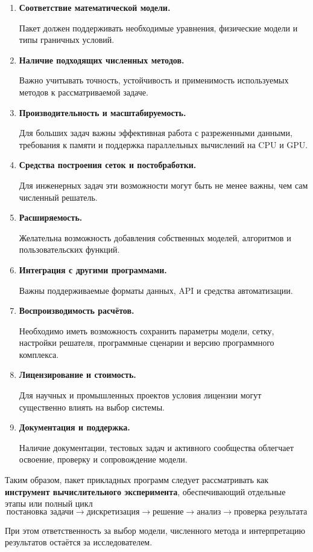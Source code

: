\begin{enumerate}
	\item \textbf{Соответствие математической модели.}
	
	Пакет должен поддерживать необходимые уравнения, физические модели и типы граничных условий.
	
	\item \textbf{Наличие подходящих численных методов.}
	
	Важно учитывать точность, устойчивость и применимость используемых методов к рассматриваемой задаче.
	
	\item \textbf{Производительность и масштабируемость.}
	
	Для больших задач важны эффективная работа с разреженными данными, требования к памяти и поддержка параллельных вычислений на CPU и GPU.
	
	\item \textbf{Средства построения сеток и постобработки.}
	
	Для инженерных задач эти возможности могут быть не менее важны, чем сам численный решатель.
	
	\item \textbf{Расширяемость.}
	
	Желательна возможность добавления собственных моделей, алгоритмов и пользовательских функций.
	
	\item \textbf{Интеграция с другими программами.}
	
	Важны поддерживаемые форматы данных, API и средства автоматизации.
	
	\item \textbf{Воспроизводимость расчётов.}
	
	Необходимо иметь возможность сохранить параметры модели, сетку, настройки решателя, программные сценарии и версию программного комплекса.
	
	\item \textbf{Лицензирование и стоимость.}
	
	Для научных и промышленных проектов условия лицензии могут существенно влиять на выбор системы.
	
	\item \textbf{Документация и поддержка.}
	
	Наличие документации, тестовых задач и активного сообщества облегчает освоение, проверку и сопровождение модели.
\end{enumerate}

Таким образом, пакет прикладных программ следует рассматривать как \textbf{инструмент вычислительного эксперимента}, обеспечивающий отдельные этапы или полный цикл
\[
\boxed{
	\text{постановка задачи}
	\rightarrow
	\text{дискретизация}
	\rightarrow
	\text{решение}
	\rightarrow
	\text{анализ}
	\rightarrow
	\text{проверка результата}
}
\]

При этом ответственность за выбор модели, численного метода и интерпретацию результатов остаётся за исследователем.

\newpage